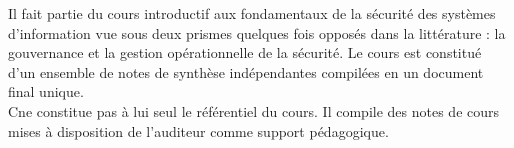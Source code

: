 

Il fait partie du cours introductif aux fondamentaux de la sécurité des systèmes d'information vue sous deux prismes quelques fois opposés dans la littérature : la gouvernance et la gestion opérationnelle de la sécurité.
Le cours est constitué d'un ensemble de notes de synthèse indépendantes compilées en un document final unique.\\
C\edoc ne constitue pas à lui seul le référentiel du cours. Il compile des notes de cours mises à disposition de l'auditeur comme support pédagogique.